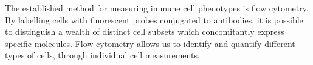 



The established method for measuring immune cell phenotypes is flow cytometry.
By labelling cells with fluorescent probes conjugated to antibodies, it is possible to distinguish a wealth of distinct cell
subsets which concomitantly express specific molecules.
Flow cytometry allows us to identify and quantify different types of cells, through individual cell measurements.

